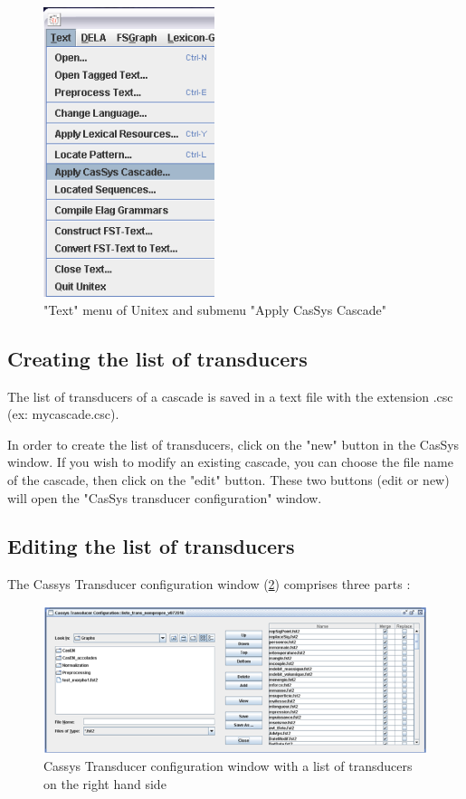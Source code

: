 \begin{figure}[!htb]
 \centering
 \includegraphics[width=5cm]{resources/img/fig13-01.png}
 \caption{"Text" menu of Unitex and submenu "Apply CasSys Cascade"}
 \label{fig13-01}
\end{figure}


\subsection{Creating the list of transducers}
\label{subsec:listTrans}

The list of transducers of a cascade is saved in a text file with the extension .csc (ex: mycascade.csc).

\bigskip
\noindent In order to create the list of transducers, click on the "new" button in the CasSys window. 
If you wish to modify an existing cascade, you can choose the file name of the cascade, then click on the "edit" button. 
These two buttons (edit or new) will open the "CasSys transducer configuration" window.

\subsection{Editing the list of transducers}
\label{subsec:editlistTrans}

The Cassys Transducer configuration window (\ref{fig13-03}) comprises three parts :

\begin{figure}[!htb]
  \centering
  \includegraphics[width=14cm]{resources/img/fig13-03.png}
  \caption{Cassys Transducer configuration window with a list of transducers on the right hand side}
  \label{fig13-03}
\end{figure}

